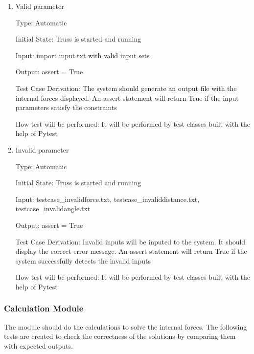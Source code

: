 \documentclass[12pt, titlepage]{article}
\begin{document}
\begin{enumerate}

\item{Valid parameter\\}

Type: Automatic
					
Initial State: Truss is started and running
					
Input: import input.txt with valid input sets
					
Output: assert = True

Test Case Derivation: The system should generate an output file with the 
internal forces displayed. An assert statement will return True if the input 
parameters satisfy the constraints

How test will be performed: It will be performed by test classes built with the 
help of Pytest
					
\item{Invalid parameter\\}

Type: Automatic
					
Initial State: Truss is started and running
					
Input: testcase\_invalidforce.txt, testcase\_invaliddistance.txt, 
testcase\_invalidangle.txt
					
Output: assert = True

Test Case Derivation: Invalid inputs will be inputed to the system. It should 
display the correct error message. An assert statement will return True if the 
system successfully detects the invalid inputs 

How test will be performed: It will be performed by test classes built with the 
help of Pytest

\end{enumerate}

\subsubsection{Calculation Module} \label{calculation}
The module should do the calculations to solve the internal forces. The 
following tests are created to check the correctness of the solutions by 
comparing them with expected outputs. 
\end{document}
